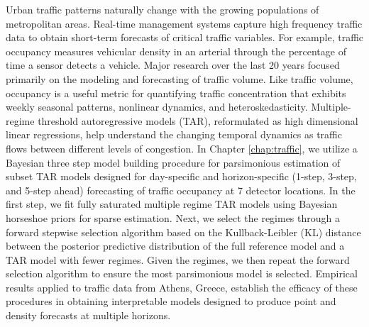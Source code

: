 Urban traffic patterns naturally change with the growing populations of metropolitan areas. Real-time management systems capture high frequency traffic data to obtain short-term forecasts of critical traffic variables.  For example, traffic occupancy measures vehicular density in an arterial through the percentage of time a sensor detects a vehicle. Major research over the last 20 years focused primarily on the modeling and forecasting of traffic volume. Like traffic volume,  occupancy is a useful metric for quantifying traffic concentration that exhibits weekly seasonal patterns, nonlinear dynamics, and heteroskedasticity. Multiple-regime threshold autoregressive models (TAR), reformulated as high dimensional linear regressions, help understand the changing temporal dynamics as traffic flows between different levels of congestion. In Chapter \ref{chap:traffic}, we utilize a Bayesian three step model building procedure for parsimonious estimation of subset TAR models designed for day-specific and horizon-specific (1-step, 3-step, and 5-step ahead) forecasting of traffic occupancy at 7 detector locations. In the first step, we fit fully saturated multiple regime TAR models using Bayesian horseshoe priors for sparse estimation. Next, we select the regimes through a forward stepwise selection algorithm based on the Kullback-Leibler (KL) distance between the posterior predictive distribution of the full reference model and a TAR model with fewer regimes. Given the regimes, we then repeat the forward selection algorithm to ensure the most parsimonious model is selected. Empirical results applied to traffic data from Athens, Greece, establish the efficacy of these procedures in obtaining interpretable models designed to produce point and density forecasts at multiple horizons.

